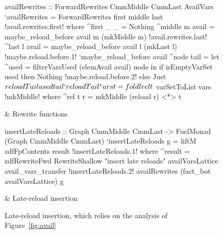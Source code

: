 \documentclass[blockstyle,preprint,natbib,nocopyrightspace]{sigplanconf}
\newcommand\seclabel[1]{\label{sec:#1}}
\newcommand\figref[1]{Figure~\ref{fig:#1}}
\newcommand\figlabel[1]{\label{fig:#1}}
\begin{document}
\begin{figure*}
\begin{codetable}
\T
\begin{code}
availRewrites :: ForwardRewrites CmmMiddle CmmLast AvailVars
`availRewrites = ForwardRewrites first middle last
!avail.rewrites.first!  where ^first _ _ = Nothing
        ^middle m avail = maybe_reload_before avail m (mkMiddle m)
!avail.rewrites.last!        ^last   l avail = maybe_reload_before avail l (mkLast l)
!maybe.reload.before.1!        `maybe_reload_before avail ^node tail =
            let ^used = filterVarsUsed (elemAvail avail) node
            in  if isEmptyVarSet used then Nothing
!maybe.reload.before.2!                else Just $ reloadTail used tail
        `reloadTail ^vars t = foldl rel t $ varSetToList vars
!mkMiddle!          where ^rel t r = mkMiddle (reload r) <*> t
\end{code}
\B
& Rewrite \mbox{functions}\\
\hline

\T
\begin{code}
insertLateReloads :: Graph CmmMiddle CmmLast -> FuelMonad (Graph CmmMiddle CmmLast)
`insertLateReloads g = liftM zdfFpContents result
!insertLateReloads.1!  where ^result = zdfRewriteFwd RewriteShallow "insert late reloads"
                               availVarsLattice avail_vars_transfer
!insertLateReloads.2!                               availRewrites (fact_bot availVarsLattice) g
\end{code}
& Late-reload insertion\\
\end{codetable}
\caption{Late-reload insertion, which relies on the analysis of \figref{avail}}
\figlabel{avail-rewrites}
\end{figure*}


\seclabel{dfengine-spec}
\end{document}
